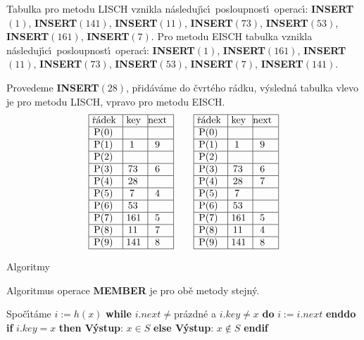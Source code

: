 \documentclass[a4paper,12pt]{article}
\begin{document}
\flushpar Tabulka pro metodu LISCH vznikla n\'asleduj\'\i c\'\i\ posloupnost\'\i\ 
operac\'\i :\newline 
{\bf INSERT$(1)$}, {\bf INSERT$(141)$}, {\bf INSERT$(11)$}, {\bf INSERT$
(73)$}, 
{\bf INSERT$(53)$},\newline 
{\bf INSERT$(161)$}, {\bf INSERT$(7)$}.\newline 
Pro metodu EISCH tabulka vznikla n\'asleduj\'\i c\'\i\ posloupnost\'\i\ 
operac\'\i :\newline 
{\bf INSERT$(1)$}, {\bf INSERT$(161)$}, {\bf INSERT$(11)$}, {\bf INSERT$
(73)$}, 
{\bf INSERT$(53)$}, {\bf INSERT$(7)$}, {\bf INSERT$(141)$}. 

\flushpar Provedeme {\bf INSERT$(28)$}, p\v rid\'av\'ame do \v cvrt\'eho r\'adku, v\'y\-sled\-n\'a tabulka vlevo je pro meto\-du 
LISCH, vpravo pro metodu EISCH.
$$\vbox {\hbox{\vtop{\offinterlineskip\halign{\strut\vrule\ # & \vrule\ # & \vrule\hfil# \hfil\vrule\cr\noalign{\hrule}\v r\'adek & key & next \hfil\cr\noalign{\hrule}P(0) & &\hfill \cr\noalign{\hrule}P(1) & 1 & 9 \cr\noalign{\hrule}P(2) & &\hfill \cr\noalign{\hrule}P(3) & 73 & 6 \cr\noalign{\hrule}P(4) & 28 &\hfill \cr\noalign{\hrule}P(5) & 7 & 4 \cr\noalign{\hrule}P(6) & 53 &\hfill \cr\noalign{\hrule}P(7) & 161 & 5 \cr\noalign{\hrule}P(8) & 11 & 7 \cr\noalign{\hrule}P(9) & 141 & 8 \cr\noalign{\hrule}}}\qquad\vtop{\offinterlineskip\halign {\strut\vrule\ # & \vrule\ # & \vrule \hfil # \hfil \vrule\cr\noalign{\hrule}\v r\'adek & key & next \hfil \cr\noalign{\hrule}P(0) & &\hfill \cr\noalign{\hrule}P(1) & 1 & 9 \cr\noalign{\hrule}P(2) & &\hfill \cr\noalign{\hrule}P(3) & 73 & 6 \cr\noalign{\hrule}P(4) & 28 & 7 \cr\noalign{\hrule}P(5) & 7 & \hfill \cr\noalign{\hrule}P(6) & 53 & \hfill \cr\noalign{\hrule}P(7) & 161 & 5 \cr\noalign{\hrule}P(8) & 11 & 4  \cr\noalign{\hrule}P(9) & 141 & 8 \cr\noalign{\hrule}}}}}$$
\medskip

\subhead
Algoritmy
\endsubhead
\smallskip

\flushpar Algoritmus operace {\bf MEMBER} je pro ob\v e metody stejn\'y.
\bigskip

\newline 
Spo\v c\'\i t\'ame $i:=h(x)$\newline 
{\bf while} $i.next\ne$pr\'azdn\'e a $i.key\ne x$ {\bf do} $i:=i.
next$ {\bf enddo \newline 
if} $i.key=x$ {\bf then V\'ystup}: $x\in S$ {\bf else V\'ystup}: $
x\notin S$ {\bf endif}
\bigskip
\end{document}
